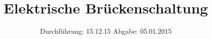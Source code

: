 

\subject{302}
\title{Elektrische Brückenschaltung}
\date{
  Durchführung: 15.12.15
  \hspace{3em}
  Abgabe: 05.01.2015
}



\maketitle
\thispagestyle{empty}
\tableofcontents
\newpage






\printbibliography


